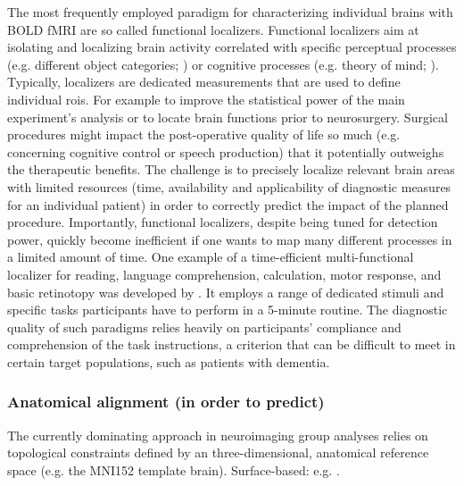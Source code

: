 
%
The most frequently employed paradigm for characterizing individual brains with
BOLD fMRI are so called functional localizers.
%
Functional localizers aim at isolating and localizing brain activity correlated
with specific perceptual processes (e.g. different object categories;
\citet{kanwisher1997ffa}) or cognitive processes (e.g. theory of mind;
\citet{spunt2014validating}).
%
Typically, localizers are dedicated measurements that are used to define
individual \acp{roi}.
%
For example to improve the statistical power of the main experiment's analysis
or to locate brain functions prior to neurosurgery.
Surgical procedures might impact the post-operative quality of life so much
(e.g. concerning cognitive control or speech production) that it potentially
outweighs the therapeutic benefits.
%
The challenge is to precisely localize relevant brain areas with limited
resources (time, availability and applicability of diagnostic measures for an
individual patient) in order to correctly predict the impact of the planned
procedure.
%
Importantly, functional localizers, despite being tuned for detection power,
quickly become inefficient if one wants to map many different processes in a
limited amount of time.
%
One example of a time-efficient multi-functional localizer for reading, language
comprehension, calculation, motor response, and basic retinotopy was developed
by \citep{pinel2007fast, pinho2018individual, pinho2020individual}.
%
It employs a range of dedicated stimuli and specific tasks participants have to
perform in a 5-minute routine.
%
The diagnostic quality of such paradigms relies heavily on participants'
compliance and comprehension of the task instructions, a criterion that can be
difficult to meet in certain target populations, such as patients with dementia.


\subsubsection{Anatomical alignment (in order to predict)}

The currently dominating approach in neuroimaging group analyses relies on
topological constraints defined by an three-dimensional, anatomical reference
space (e.g. the MNI152 template brain).
%
Surface-based: e.g. \citep{weiner2018defining}.


